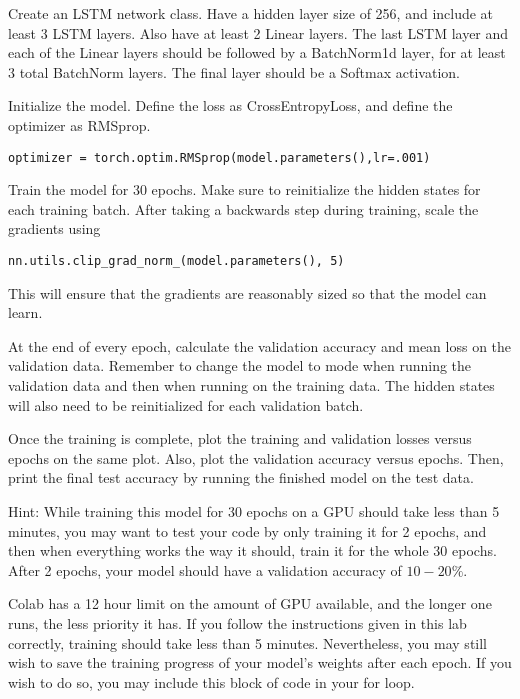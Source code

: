 \begin{problem}
Create an LSTM network class.
Have a hidden layer size of 256, and include at least 3 LSTM layers.
Also have at least 2 Linear layers.
The last LSTM layer and each of the Linear layers should be followed by a BatchNorm1d layer, for at least 3 total BatchNorm layers.
The final layer should be a Softmax activation.

Initialize the model.
Define the loss as CrossEntropyLoss, and define the optimizer as RMSprop.
\begin{lstlisting}
optimizer = torch.optim.RMSprop(model.parameters(),lr=.001)
\end{lstlisting}

Train the model for 30 epochs.
Make sure to reinitialize the hidden states  for each training batch.
After taking a backwards step during training, scale the gradients using 
\begin{lstlisting}
nn.utils.clip_grad_norm_(model.parameters(), 5)
\end{lstlisting}
This will ensure that the gradients are reasonably sized so that the model can learn.

At the end of every epoch, calculate the validation accuracy and mean loss on the validation data.
Remember to change the model to  mode when running the validation data and then  when running on the training data.
The hidden states  will also need to be reinitialized for each validation batch.

Once the training is complete, plot the training and validation losses versus epochs on the same plot.
Also, plot the validation accuracy versus epochs.
Then, print the final test accuracy by running the finished model on the test data.

Hint: While training this model for 30 epochs on a GPU should take less than 5 minutes, you may want to test your code by only training it for 2 epochs, and then when everything works the way it should, train it for the whole 30 epochs.
After 2 epochs, your model should have a validation accuracy of $10-20\%$.

\begin{warn}
Colab has a 12 hour limit on the amount of GPU available, and the longer one runs, the less priority it has.
If you follow the instructions given in this lab correctly, training should take less than 5 minutes. 
Nevertheless, you may still wish to save the training progress of your model's weights after each epoch.
If you wish to do so, you may include this block of code in your for loop.


\end{warn}
\end{problem}
